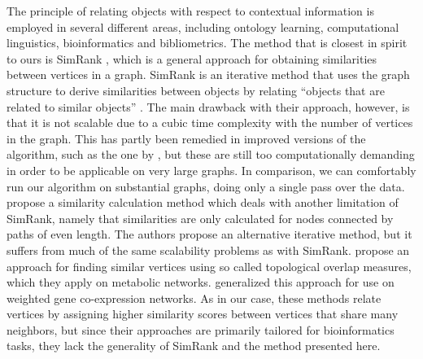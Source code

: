 \documentclass{kais}
\begin{document}
The principle of relating objects with respect to contextual information is employed in several different areas, including ontology
learning, computational linguistics, bioinformatics and bibliometrics. The method that is closest in spirit to
ours is SimRank \cite{Jeh2002simrank}, which is a general approach for obtaining similarities between vertices in a graph.
SimRank is an iterative method that uses the graph structure to derive similarities between objects by relating ``objects that are
related to similar objects'' \cite{Jeh2002simrank}. The main drawback with their approach, however, is that it is not scalable due to
a cubic time complexity with the number of vertices in the graph. This has partly been remedied in improved versions of the algorithm,
such as the one by , but these are still too computationally demanding in order to be applicable on
very large graphs. In comparison, we can comfortably run our algorithm on substantial graphs, doing only a single
pass over the data.
 propose a similarity calculation method which deals with another
limitation of SimRank, namely that similarities are only calculated for nodes connected by paths of
even length. The authors propose an alternative iterative method, but it suffers from much of the same scalability
problems as with SimRank.
 propose an approach for finding similar vertices using so called
topological overlap measures, which they apply on metabolic networks. 
generalized this approach for use on weighted gene co-expression networks. As in our case, these methods relate vertices by assigning
higher similarity scores between vertices that share many neighbors, but since their approaches are primarily tailored for bioinformatics tasks,
they lack the generality of SimRank and the method presented here.
  
\end{document}
